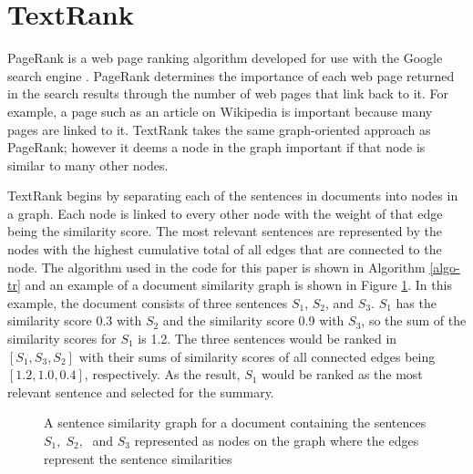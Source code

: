\documentclass{article}[10]
\begin{document}
\section{TextRank}
PageRank is a web page ranking algorithm developed for use with the Google search engine \cite{page1999pagerank}. PageRank determines the importance of each web page returned in the search results through the number of web pages that link back to it. For example, a page such as an article on Wikipedia is important because many pages are linked to it. TextRank \cite{mihalcea2004textrank} takes the same graph-oriented approach as PageRank; however it deems a node in the graph important if that node is similar to many other nodes.

TextRank begins by separating each of the sentences in documents into nodes in a graph. Each node is linked to every other node with the weight of that edge being the similarity score. The most relevant sentences are represented by the nodes with the highest cumulative total of all edges that are connected to the node. The algorithm used in the code for this paper is shown in Algorithm \ref{algo-tr} and an example of a document similarity graph is shown in Figure \ref{graph-tr}. In this example, the document consists of three sentences $S_1$, $S_2$, and $S_3$. $S_1$ has the similarity score 0.3 with $S_2$ and the similarity score 0.9 with $S_3$, so the sum of the similarity scores for $S_1$ is 1.2. The three sentences would be ranked in  $[S_{1}, S_{3}, S_{2}]$ with their sums of similarity scores of all connected edges being $[1.2, 1.0, 0.4]$, respectively. As the result, $S_1$ would be ranked as the most relevant sentence and selected for the summary.

\begin{figure}[ht]
\renewcommand{\figurename}{Figure}%
\centering
{}

\caption{A sentence similarity graph for a document containing the sentences $S_{1},\;S_{2},\;$ and $S_{3}$ represented as nodes on the graph where the edges represent the sentence similarities}
\label{graph-tr}
\end{figure}
\end{document}
